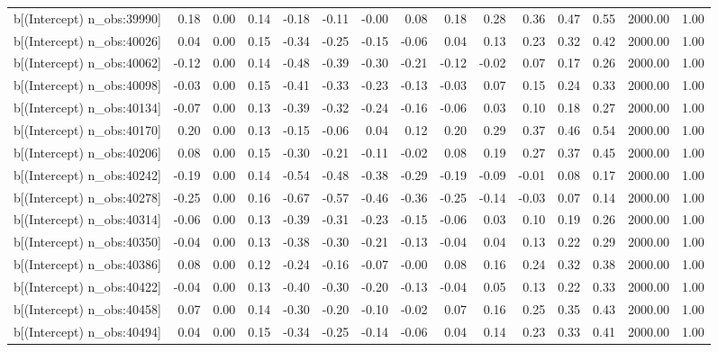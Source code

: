 \begin{table}[ht]
\begin{tabular}{rrrrrrrrrrrrrrr}
  b[(Intercept) n\_obs:39990] & 0.18 & 0.00 & 0.14 & -0.18 & -0.11 & -0.00 & 0.08 & 0.18 & 0.28 & 0.36 & 0.47 & 0.55 & 2000.00 & 1.00 \\ 
  b[(Intercept) n\_obs:40026] & 0.04 & 0.00 & 0.15 & -0.34 & -0.25 & -0.15 & -0.06 & 0.04 & 0.13 & 0.23 & 0.32 & 0.42 & 2000.00 & 1.00 \\ 
  b[(Intercept) n\_obs:40062] & -0.12 & 0.00 & 0.14 & -0.48 & -0.39 & -0.30 & -0.21 & -0.12 & -0.02 & 0.07 & 0.17 & 0.26 & 2000.00 & 1.00 \\ 
  b[(Intercept) n\_obs:40098] & -0.03 & 0.00 & 0.15 & -0.41 & -0.33 & -0.23 & -0.13 & -0.03 & 0.07 & 0.15 & 0.24 & 0.33 & 2000.00 & 1.00 \\ 
  b[(Intercept) n\_obs:40134] & -0.07 & 0.00 & 0.13 & -0.39 & -0.32 & -0.24 & -0.16 & -0.06 & 0.03 & 0.10 & 0.18 & 0.27 & 2000.00 & 1.00 \\ 
  b[(Intercept) n\_obs:40170] & 0.20 & 0.00 & 0.13 & -0.15 & -0.06 & 0.04 & 0.12 & 0.20 & 0.29 & 0.37 & 0.46 & 0.54 & 2000.00 & 1.00 \\ 
  b[(Intercept) n\_obs:40206] & 0.08 & 0.00 & 0.15 & -0.30 & -0.21 & -0.11 & -0.02 & 0.08 & 0.19 & 0.27 & 0.37 & 0.45 & 2000.00 & 1.00 \\ 
  b[(Intercept) n\_obs:40242] & -0.19 & 0.00 & 0.14 & -0.54 & -0.48 & -0.38 & -0.29 & -0.19 & -0.09 & -0.01 & 0.08 & 0.17 & 2000.00 & 1.00 \\ 
  b[(Intercept) n\_obs:40278] & -0.25 & 0.00 & 0.16 & -0.67 & -0.57 & -0.46 & -0.36 & -0.25 & -0.14 & -0.03 & 0.07 & 0.14 & 2000.00 & 1.00 \\ 
  b[(Intercept) n\_obs:40314] & -0.06 & 0.00 & 0.13 & -0.39 & -0.31 & -0.23 & -0.15 & -0.06 & 0.03 & 0.10 & 0.19 & 0.26 & 2000.00 & 1.00 \\ 
  b[(Intercept) n\_obs:40350] & -0.04 & 0.00 & 0.13 & -0.38 & -0.30 & -0.21 & -0.13 & -0.04 & 0.04 & 0.13 & 0.22 & 0.29 & 2000.00 & 1.00 \\ 
  b[(Intercept) n\_obs:40386] & 0.08 & 0.00 & 0.12 & -0.24 & -0.16 & -0.07 & -0.00 & 0.08 & 0.16 & 0.24 & 0.32 & 0.38 & 2000.00 & 1.00 \\ 
  b[(Intercept) n\_obs:40422] & -0.04 & 0.00 & 0.13 & -0.40 & -0.30 & -0.20 & -0.13 & -0.04 & 0.05 & 0.13 & 0.22 & 0.33 & 2000.00 & 1.00 \\ 
  b[(Intercept) n\_obs:40458] & 0.07 & 0.00 & 0.14 & -0.30 & -0.20 & -0.10 & -0.02 & 0.07 & 0.16 & 0.25 & 0.35 & 0.43 & 2000.00 & 1.00 \\ 
  b[(Intercept) n\_obs:40494] & 0.04 & 0.00 & 0.15 & -0.34 & -0.25 & -0.14 & -0.06 & 0.04 & 0.14 & 0.23 & 0.33 & 0.41 & 2000.00 & 1.00 \\ 

\end{tabular}
\end{table}
